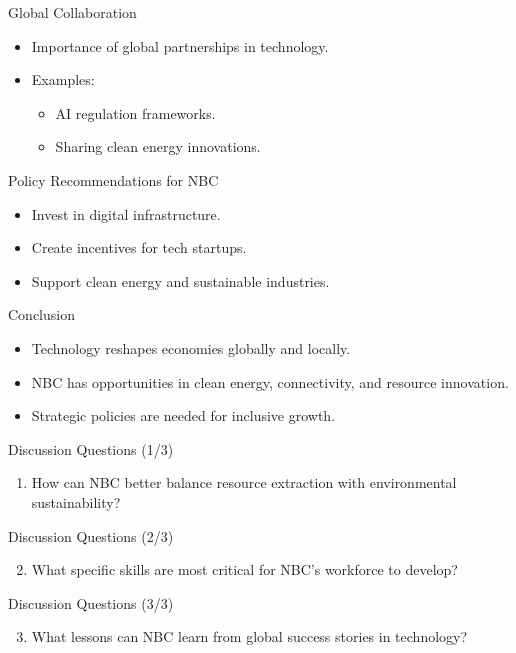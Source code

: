 \documentclass{beamer}
\begin{document}
\begin{frame}{Global Collaboration}
    \begin{itemize}
        \item Importance of global partnerships in technology.
        \item Examples:
        \begin{itemize}
            \item AI regulation frameworks.
            \item Sharing clean energy innovations.
        \end{itemize}
    \end{itemize}
\end{frame}

\begin{frame}{Policy Recommendations for NBC}
    \begin{itemize}
        \item Invest in digital infrastructure.
        \item Create incentives for tech startups.
        \item Support clean energy and sustainable industries.
    \end{itemize}
\end{frame}

\begin{frame}{Conclusion}
    \begin{itemize}
        \item Technology reshapes economies globally and locally.
        \item NBC has opportunities in clean energy, connectivity, and resource innovation.
        \item Strategic policies are needed for inclusive growth.
    \end{itemize}
\end{frame}

\begin{frame}{Discussion Questions (1/3)}
    \begin{enumerate}
        \item How can NBC better balance resource extraction with environmental sustainability?
    \end{enumerate}
\end{frame}

\begin{frame}{Discussion Questions (2/3)}
    \begin{enumerate}
        \setcounter{enumi}{1}
        \item What specific skills are most critical for NBC’s workforce to develop?
    \end{enumerate}
\end{frame}

\begin{frame}{Discussion Questions (3/3)}
    \begin{enumerate}
        \setcounter{enumi}{2}
        \item What lessons can NBC learn from global success stories in technology?
    \end{enumerate}
\end{frame}
\end{document}
